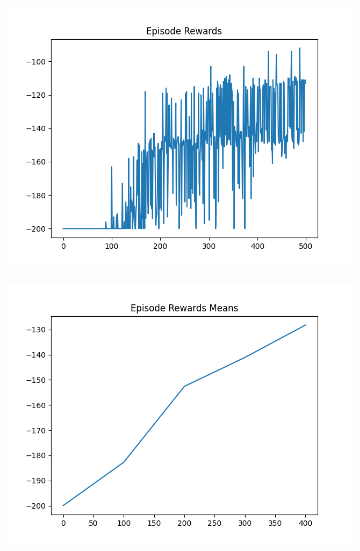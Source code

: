 \begin{figure}[H]
\begin{subfigure}{.47\linewidth}
        \includegraphics[width=\textwidth]{mountain/2024-06-15_12-43-21_dqn_mountaincar_episode_rewards.png}
    \end{subfigure}
    \begin{subfigure}{.47\linewidth}
        \centering
        \includegraphics[width=\textwidth]{mountain/2024-06-15_12-43-21_dqn_mountaincar_episode_rewards_means.png}
    \end{subfigure}
\end{figure}
